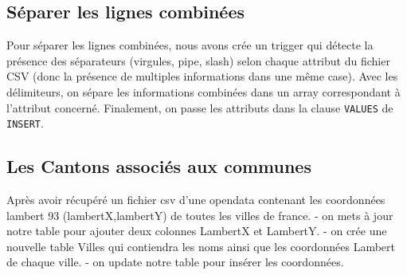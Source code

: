 \documentclass[11pt]{article}
\begin{document}
    \hypertarget{suxe9parer-les-lignes-combinuxe9es}{%
\subsection{Séparer les lignes
combinées}\label{suxe9parer-les-lignes-combinuxe9es}}

Pour séparer les lignes combinées, nous avons crée un trigger qui
détecte la présence des séparateurs (virgules, pipe, slash) selon chaque
attribut du fichier CSV (donc la présence de multiples informations dans
une même case). Avec les délimiteurs, on sépare les informations
combinées dans un array correspondant à l'attribut concerné. Finalement,
on passe les attributs dans la clause \texttt{VALUES} de
\texttt{INSERT}.

    \hypertarget{les-cantons-associuxe9s-aux-communes}{%
\subsection{Les Cantons associés aux
communes}\label{les-cantons-associuxe9s-aux-communes}}

Après avoir récupéré un fichier csv d'une opendata contenant les
coordonnées lambert 93 (lambertX,lambertY) de toutes les villes de
france. - on mets à jour notre table pour ajouter deux colonnes LambertX
et LambertY. - on crée une nouvelle table Villes qui contiendra les noms
ainsi que les coordonnées Lambert de chaque ville. - on update notre
table pour insérer les coordonnées.
\end{document}
